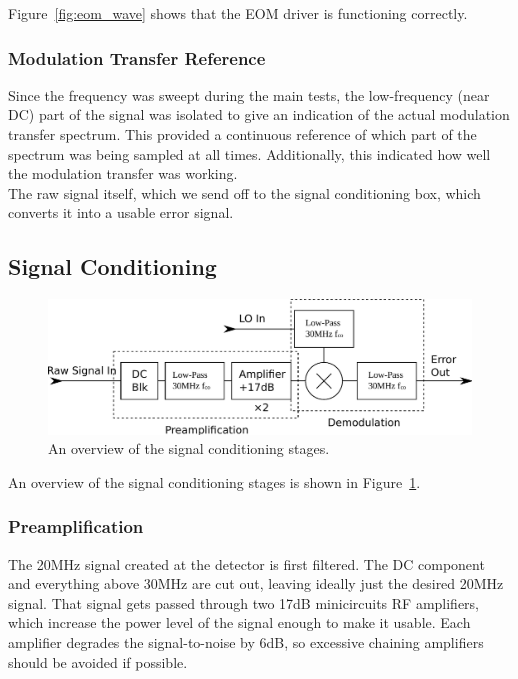 Figure~\ref{fig:eom_wave} shows that the EOM driver is functioning correctly. \\

    \subsubsection{Modulation Transfer Reference}

Since the frequency was sweept during the main tests, the low-frequency (near DC) part of the signal was isolated to give an indication of the actual modulation transfer spectrum.  This provided a continuous reference of which part of the spectrum was being sampled at all times. Additionally, this indicated how well the modulation transfer was working. \\

The raw signal itself, which we send off to the signal conditioning box, which converts it into a usable error signal. \\

\subsection{Signal Conditioning}
\label{sec:signalcond}

\begin{figure}
  \centering\includegraphics[width=\textwidth]{figures/rf_design.pdf}
  \caption{An overview of the signal conditioning stages.}
  \label{rf_design}
\end{figure}

An overview of the signal conditioning stages is shown in Figure~\ref{rf_design}. \\

    \subsubsection{Preamplification}

The 20MHz signal created at the detector is first filtered.  The DC component and everything above 30MHz are cut out, leaving ideally just the desired 20MHz signal.  That signal gets passed through two 17dB minicircuits RF amplifiers, which increase the power level of the signal enough to make it usable.  Each amplifier degrades the signal-to-noise by 6dB, so excessive chaining amplifiers should be avoided if possible. \\

